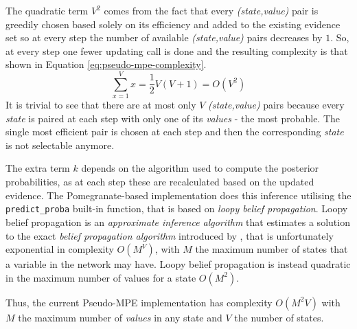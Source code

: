 The quadratic term $V^2$ comes from the fact that every \textit{(state,value)} pair is greedily chosen based solely on its efficiency and added to the existing evidence set so at every step the number of available \textit{(state,value)} pairs decreases by $1$.
So, at every step one fewer updating call is done and the resulting complexity is that shown in Equation \ref{eq:pseudo-mpe-complexity}.
\begin{equation} \label{eq:pseudo-mpe-complexity}
	\sum_{x=1}^{V} x=\frac{1}{2} V(V+1) = O(V^2)
\end{equation}
It is trivial to see that there are at most only $V$ \textit{(state,value)} pairs because every \textit{state} is paired at each step with only one of its \textit{values} - the most probable.
The single most efficient pair is chosen at each step and then the corresponding \textit{state} is not selectable anymore.

The extra term $k$ depends on the algorithm used to compute the posterior probabilities, as at each step these are recalculated based on the updated evidence.
The Pomegranate-based implementation does this inference utilising the \texttt{predict\_proba} built-in function, that is based on \textit{loopy belief propagation}.
Loopy belief propagation is an \textit{approximate inference algorithm} that estimates a solution to the exact \textit{belief propagation algorithm} introduced by \citet{pearl1982reverend}, that is unfortunately exponential in complexity $O(M^V)$, with $M$ the maximum number of states that a variable in the network may have.
Loopy belief propagation is instead quadratic in the maximum number of values for a state $O(M^2)$.

Thus, the current Pseudo-MPE implementation has complexity $O(M^2V)$ with $M$ the maximum number of \textit{values} in any state and $V$ the number of states.